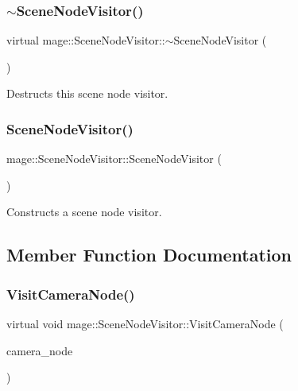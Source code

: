 \subsubsection{\texorpdfstring{$\sim$\+Scene\+Node\+Visitor()}{~SceneNodeVisitor()}}
{\footnotesize\ttfamily virtual mage\+::\+Scene\+Node\+Visitor\+::$\sim$\+Scene\+Node\+Visitor (\begin{DoxyParamCaption}{ }\end{DoxyParamCaption})\hspace{0.3cm}{\ttfamily [virtual]}}

Destructs this scene node visitor. \hypertarget{classmage_1_1_scene_node_visitor_a6a259a0ce19107bb644482b86c4bd27a}{}\label{classmage_1_1_scene_node_visitor_a6a259a0ce19107bb644482b86c4bd27a} 
\subsubsection{\texorpdfstring{Scene\+Node\+Visitor()}{SceneNodeVisitor()}}
{\footnotesize\ttfamily mage\+::\+Scene\+Node\+Visitor\+::\+Scene\+Node\+Visitor (\begin{DoxyParamCaption}{ }\end{DoxyParamCaption})\hspace{0.3cm}{\ttfamily [protected]}}

Constructs a scene node visitor. 

\subsection{Member Function Documentation}
\hypertarget{classmage_1_1_scene_node_visitor_a01d831e494396ab678ce0c29b008a398}{}\label{classmage_1_1_scene_node_visitor_a01d831e494396ab678ce0c29b008a398} 
\subsubsection{\texorpdfstring{Visit\+Camera\+Node()}{VisitCameraNode()}\hspace{0.1cm}{\footnotesize\ttfamily [1/2]}}
{\footnotesize\ttfamily virtual void mage\+::\+Scene\+Node\+Visitor\+::\+Visit\+Camera\+Node (\begin{DoxyParamCaption}\item[{\hyperlink{classmage_1_1_camera_node}{Camera\+Node} \&}]{camera\+\_\+node }\end{DoxyParamCaption})\hspace{0.3cm}{\ttfamily [virtual]}}

